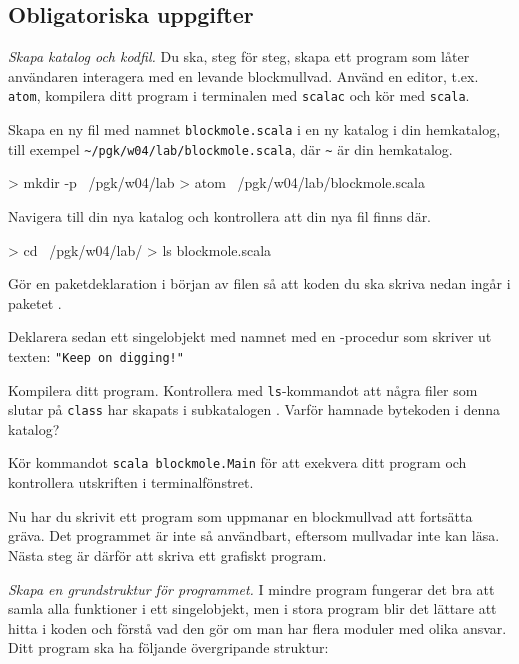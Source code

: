 \subsection{Obligatoriska uppgifter}


\Task \emph{Skapa katalog och kodfil.}
Du ska, steg för steg, skapa ett program som låter användaren interagera med en levande blockmullvad. Använd en editor, t.ex. \texttt{atom}, kompilera ditt program i terminalen med \texttt{scalac} och kör med \texttt{scala}.

\Subtask
Skapa en ny fil med namnet \texttt{blockmole.scala} i en ny katalog i din hemkatalog, till exempel \texttt{\textasciitilde/pgk/w04/lab/blockmole.scala}, där \texttt{\textasciitilde} är din hemkatalog.
\begin{REPLnonum}
> mkdir -p ~/pgk/w04/lab
> atom ~/pgk/w04/lab/blockmole.scala
\end{REPLnonum}


\Subtask
Navigera till din nya katalog och kontrollera att din nya fil finns där.
\begin{REPLnonum}
> cd ~/pgk/w04/lab/
> ls
blockmole.scala
\end{REPLnonum}

\Subtask
Gör en paketdeklaration i början av filen  så att koden du ska skriva nedan ingår i paketet .

\Subtask
Deklarera sedan ett singelobjekt med namnet  med en -procedur som skriver ut texten: \texttt{"Keep on digging!"}

\Subtask
Kompilera ditt program. Kontrollera med \texttt{ls}-kommandot att några filer som slutar på \texttt{class} har skapats i subkatalogen . \Pen Varför hamnade bytekoden i denna katalog?

\Subtask
Kör kommandot \texttt{scala blockmole.Main} för att exekvera ditt program och kontrollera utskriften i terminalfönstret.

\vspace{1em}\noindent Nu har du skrivit ett program som uppmanar en blockmullvad att fortsätta gräva. Det programmet är inte så användbart, eftersom mullvadar inte kan läsa. Nästa steg är därför att skriva ett grafiskt program.%



\Task \emph{Skapa en grundstruktur för programmet.}
I mindre program fungerar det bra att samla alla funktioner i ett singelobjekt, men i stora program blir det lättare att hitta i koden och förstå vad den gör om man har flera moduler med olika ansvar. Ditt program ska ha följande övergripande struktur:


